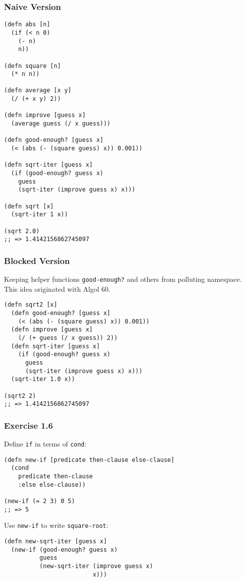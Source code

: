 \documentclass[11pt]{article}
\begin{document}
\subsubsection{Naive Version}
\label{sec-1-1-1}
\begin{verbatim}
(defn abs [n]
  (if (< n 0)
    (- n)
    n))

(defn square [n]
  (* n n))

(defn average [x y]
  (/ (+ x y) 2))

(defn improve [guess x]
  (average guess (/ x guess)))

(defn good-enough? [guess x]
  (< (abs (- (square guess) x)) 0.001))

(defn sqrt-iter [guess x]
  (if (good-enough? guess x)
    guess
    (sqrt-iter (improve guess x) x)))

(defn sqrt [x]
  (sqrt-iter 1 x))

(sqrt 2.0)
;; => 1.4142156862745097
\end{verbatim}

\subsubsection{Blocked Version}
\label{sec-1-1-2}
Keeping helper functions \texttt{good-enough?} and others from polluting namespace. This idea originated with Algol 60.

\begin{verbatim}
(defn sqrt2 [x]
  (defn good-enough? [guess x]
    (< (abs (- (square guess) x)) 0.001))
  (defn improve [guess x]
    (/ (+ guess (/ x guess)) 2))
  (defn sqrt-iter [guess x]
    (if (good-enough? guess x)
      guess
      (sqrt-iter (improve guess x) x)))
  (sqrt-iter 1.0 x))

(sqrt2 2)
;; => 1.4142156862745097
\end{verbatim}

\subsubsection{Exercise 1.6}
\label{sec-1-1-3}
Define \texttt{if} in terms of \texttt{cond}:

\begin{verbatim}
(defn new-if [predicate then-clause else-clause]
  (cond
    predicate then-clause
    :else else-clause))

(new-if (= 2 3) 0 5)
;; => 5
\end{verbatim}

Use \texttt{new-if} to write \texttt{square-root}:
\begin{verbatim}
(defn new-sqrt-iter [guess x]
  (new-if (good-enough? guess x)
          guess
          (new-sqrt-iter (improve guess x)
                         x)))
\end{verbatim}
\end{document}
